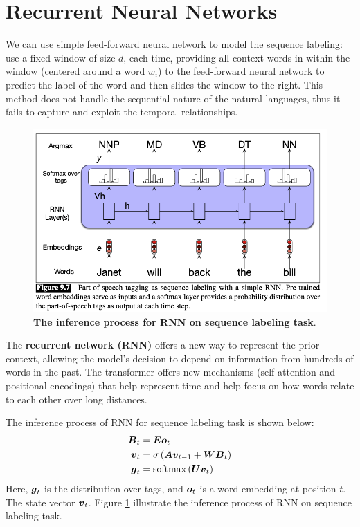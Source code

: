 \documentclass[11pt]{article}
\begin{document}
\section{Recurrent Neural Networks}
We can use simple feed-forward neural network to model the sequence labeling: use a fixed window of size $d$, each time, providing all context words in within the window (centered around a word $w_{i}$) to the feed-forward neural network to predict the label of the word and then slides the window to the right. This method does not handle the sequential nature of the natural languages, thus it fails to capture and exploit the temporal relationships.  

\begin{figure}
\begin{minipage}[t]{1\linewidth}
  \centering
  \centerline{\includegraphics[scale = 0.4]{rnn_inference.png}}
\end{minipage}
\caption{\footnotesize{\textbf{The inference process for RNN on sequence labeling task}.}}
\label{fig: rnn_inference}
\end{figure}

The \textbf{recurrent network (RNN)} offers a new way to represent the prior context, allowing the model’s decision to depend on information from hundreds of words in the past. The transformer offers new mechanisms (self-attention and positional encodings) that help represent time and help focus on how words relate to each other over long distances. 



The inference process of RNN for sequence labeling task is shown below: 
\begin{align*}
\boldsymbol{B}_{t} &= \boldsymbol{E}\boldsymbol{o}_{t} \\
\boldsymbol{v}_{t} &= \sigma\left(\boldsymbol{A}\boldsymbol{v}_{t-1} + \boldsymbol{W}\boldsymbol{B}_{t}\right) \\
\boldsymbol{g}_{t} &= \text{softmax}\left(\boldsymbol{U}\boldsymbol{v}_{t}\right)
\end{align*} Here, $\boldsymbol{g}_{t}$ is the distribution over tags, and $\boldsymbol{o}_{t}$ is a word embedding at position $t$. The state vector $\boldsymbol{v}_{t}$. Figure \ref{fig: rnn_inference} illustrate the inference process of RNN on sequence labeling task.
\end{document}
